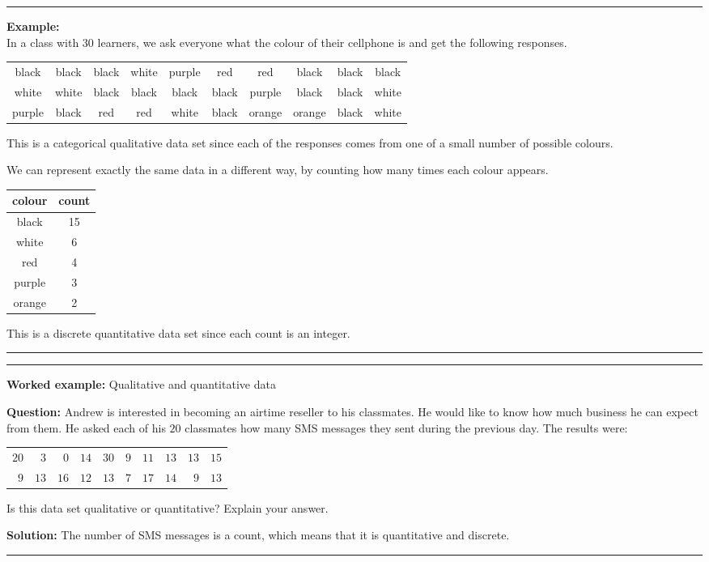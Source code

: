 \documentclass[a4paper,11pt]{report}
\newenvironment{wex}[3]%
{\rule{\linewidth}{0.5mm}
\textbf{Worked example:} #1

\textbf{Question:} #2

\textbf{Solution:} #3}%
{\rule{\linewidth}{0.5mm}}
\newenvironment{example}%
{\rule{\linewidth}{0.5mm}
\textbf{Example:} \\}%
{\rule{\linewidth}{0.5mm}}
\begin{document}
\begin{example}
  In a class with $30$ learners, we ask everyone what the colour of
  their cellphone is and get the following responses.

  \begin{center}
    \begin{tabular}{cccccccccc}
      \toprule
      black & black & black & white & purple & red & red & black & black & black \\
      white & white & black & black & black & black & purple & black & black & white \\
      purple & black & red & red & white & black & orange & orange & black & white \\
      \bottomrule
    \end{tabular}
  \end{center}

  This is a categorical qualitative data set since each of the
  responses comes from one of a small number of possible colours.

  We can represent exactly the same data in a different way, by
  counting how many times each colour appears.

  \begin{center}
    \begin{tabular}{cc}
      \toprule
      colour & count \\
      \midrule
      black & 15 \\
      white & 6 \\
      red & 4 \\
      purple & 3 \\
      orange & 2\\
      \bottomrule
    \end{tabular}
  \end{center}

  This is a discrete quantitative data set since each count is an
  integer.

\end{example}

\begin{wex}{Qualitative and quantitative data}{
    Andrew is interested in becoming an airtime reseller to his
    classmates. He would like to know how much business he can expect
    from them. He asked each of his $20$ classmates how many SMS
    messages they sent during the previous day. The results were:

    \begin{center}
      \begin{tabular}{rrrrrrrrrr}
        \toprule
        $20$ & $ 3$ & $ 0$ & $14$ & $30$ & $9$ & $11$ & $13$ & $13$ & $15$ \\
         $9$ & $13$ & $16$ & $12$ & $13$ & $7$ & $17$ & $14$ & $ 9$ & $13$ \\
        \bottomrule
      \end{tabular}
    \end{center}

    Is this data set qualitative or quantitative? Explain your answer.
}{
  The number of SMS messages is a count, which means that it is
  quantitative and discrete.

}
\end{wex}
\end{document}
